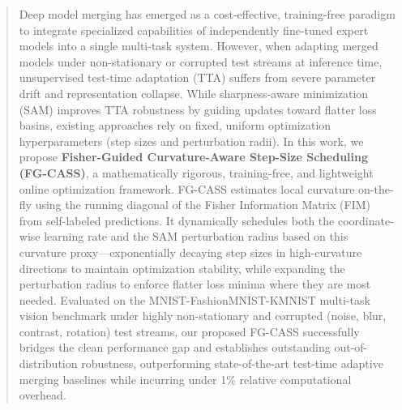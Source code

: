 \documentclass{article}
\theoremstyle{plain}
\theoremstyle{definition}
\theoremstyle{remark}
\begin{document}

\printAffiliationsAndNotice{}

\begin{abstract}
Deep model merging has emerged as a cost-effective, training-free paradigm to integrate specialized capabilities of independently fine-tuned expert models into a single multi-task system. However, when adapting merged models under non-stationary or corrupted test streams at inference time, unsupervised test-time adaptation (TTA) suffers from severe parameter drift and representation collapse. While sharpness-aware minimization (SAM) improves TTA robustness by guiding updates toward flatter loss basins, existing approaches rely on fixed, uniform optimization hyperparameters (step sizes and perturbation radii). In this work, we propose \textbf{Fisher-Guided Curvature-Aware Step-Size Scheduling (FG-CASS)}, a mathematically rigorous, training-free, and lightweight online optimization framework. FG-CASS estimates local curvature on-the-fly using the running diagonal of the Fisher Information Matrix (FIM) from self-labeled predictions. It dynamically schedules both the coordinate-wise learning rate and the SAM perturbation radius based on this curvature proxy—exponentially decaying step sizes in high-curvature directions to maintain optimization stability, while expanding the perturbation radius to enforce flatter loss minima where they are most needed. Evaluated on the MNIST-FashionMNIST-KMNIST multi-task vision benchmark under highly non-stationary and corrupted (noise, blur, contrast, rotation) test streams, our proposed FG-CASS successfully bridges the clean performance gap and establishes outstanding out-of-distribution robustness, outperforming state-of-the-art test-time adaptive merging baselines while incurring under 1\% relative computational overhead.
\end{abstract}
\end{document}
